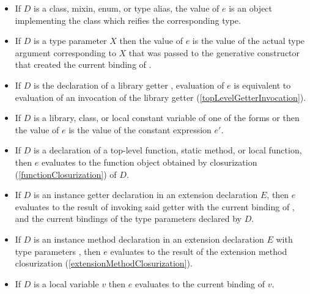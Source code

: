 \documentclass[makeidx]{article}
\begin{document}
{\begin{itemize}
\item
  If $D$ is a class, mixin, enum, or type alias,
  the value of $e$ is an object implementing the class 
  which reifies the corresponding type.
\item
  If $D$ is a type parameter $X$ then the value of $e$ is
  the value of the actual type argument corresponding to $X$
  that was passed to the generative constructor that created
  the current binding of \THIS.
\item
  If $D$ is the declaration of a library getter
  ,
  evaluation of $e$ is equivalent to evaluation of an invocation of
  the library getter \id{}
  (\ref{topLevelGetterInvocation}).
\item
  If $D$ is a library, class, or local constant variable of one of the forms
   or 
  then the value of $e$ is the value of the constant expression $e'$.
\item
  If $D$ is a declaration of
  a top-level function, static method, or local function,
  then $e$ evaluates to the function object obtained by closurization
  (\ref{functionClosurization})
  of $D$.
\item
  If $D$ is an instance getter declaration in an extension declaration $E$,
  then $e$ evaluates to the result of invoking said getter
  with the current binding of \THIS, and
  the current bindings of the type parameters declared by $D$.
\item
  If $D$ is an instance method declaration in an extension declaration $E$
  with type parameters ,
  then $e$ evaluates to the result of the extension method closurization
  (\ref{extensionMethodClosurization}).
\item
  If $D$ is a local variable $v$
  then $e$ evaluates to the current binding of $v$.
\end{itemize}

\EndCase

}
\end{document}
